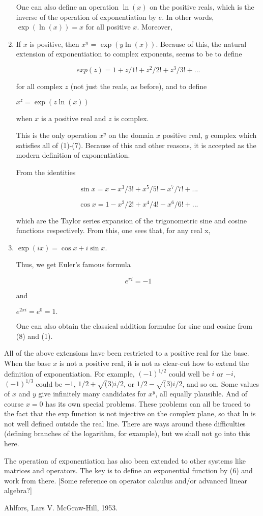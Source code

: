 \begin{enumerate}
  One can also define an operation $\ln(x)$ on the positive reals, which
  is the inverse of the operation of exponentiation by $e$.  In other
  words, $\exp(\ln(x)) = x$ for all positive $x$.  Moreover,

  \item If $x$ is positive, then $x^y$ = $\exp(y \ln(x))$.  Because of
  this, the natural extension of exponentiation to complex exponents,
  seems to be to define

  \[ exp(z) = 1 + z/1! + z^2/2! + z^3/3! + ...\]

  for all complex $z$ (not just the reals, as before), and to define

  $x^z = \exp(z \ln(x))$

  when $x$ is a positive real and $z$ is complex.

  This is the only operation $x^y$ on the domain {$x$ positive real, $y$
    complex} which satisfies all of (1)-(7).  Because of this and other
  reasons, it is accepted as the modern definition of exponentiation.

  From the identities

  \[ \sin x = x - x^3/3! + x^5/5! - x^7/7! + ...\]

  \[ \cos x = 1 - x^2/2! + x^4/4! - x^6/6! + ... \]

  which are the Taylor series expansion of the trigonometric sine and
  cosine functions respectively.  From this, one sees that, for any real
  x,

  \item $ \exp(ix) = \cos x + i \sin x.$

  Thus, we get Euler's famous formula

  \[e^{\pi i} = -1\]

  and

  $e^{2\pi i} = e^0 = 1.$

  One can also obtain the classical addition formulae for sine and
  cosine from (8) and (1).
\end{enumerate}

All of the above extensions have been restricted to a positive real for
the base.  When the base $x$ is not a positive real, it is not as
clear-cut how to extend the definition of exponentiation.  For example,
$(-1)^{1/2}$ could well be $i$ or $-i$, $(-1)^{1/3}$ could be $-1$, $1/2
+ \sqrt(3)i/2$, or $1/2 - \sqrt(3)i/2$, and so on.  Some values of $x$
and $y$ give infinitely many candidates for $x^y$, all equally
plausible.  And of course $x=0$ has its own special problems.  These
problems can all be traced to the fact that the exp function is not
injective on the complex plane, so that ln is not well defined outside
the real line.  There are ways around these difficulties (defining
branches of the logarithm, for example), but we shall not go into this
here.

The operation of exponentiation has also been extended to other systems
like matrices and operators.  The key is to define an exponential
function by (6) and work from there.  [Some reference on operator
calculus and/or advanced linear algebra?]

\Ref

  {Ahlfors, Lars V.}  {McGraw-Hill, 1953.}
